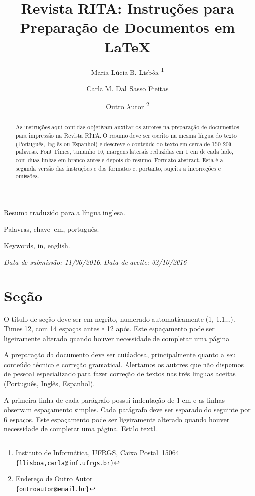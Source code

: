 \documentclass{RITA}
\title{Revista RITA: Instruções para Preparação de Documentos em \LaTeX}
\author{
Maria Lúcia B. Lisbôa
\footnote{Instituto de Informática, UFRGS, Caixa Postal~15064\\
  \texttt{\{llisboa,carla@inf.ufrgs.br\}}}
\and
Carla M. Dal~Sasso Freitas
\footnotemark[1]
\and
Outro Autor
\footnote{Endereço de Outro Autor\\
  \texttt{\{outroautor@email.br\}}}
}
\begin{document}
\maketitle

\begin{abstract}
As instruções aqui contidas objetivam auxiliar os autores na
preparação de documentos para impressão na Revista RITA.  O
resumo deve ser escrito na mesma língua do texto (Português, Inglês ou
Espanhol) e descreve o conteúdo do texto em cerca de 150-200
palavras. Font Times, tamanho 10, margens laterais reduzidas em 1 cm
de cada lado, com duas linhas em branco antes e depois do
resumo. Formato abstract. Esta é a segunda versão das instruções e
dos formatos e, portanto, sujeita a incorreções e omissões. 
\end{abstract}

\begin{abstractinenglish}
Resumo traduzido para a língua inglesa.
\end{abstractinenglish}

\begin{keywords}
Palavras, chave, em, português.
\end{keywords}

\begin{keywordsenglish}
Keywords, in, english.
\end{keywordsenglish}

\begin{center}                        
    \textit{Data de submissão: 11/06/2016}, \textit{Data de aceite: 02/10/2016}
\end{center}



\section{Seção}
O título de seção deve ser em negrito, numerado automaticamente (1, 1.1,..), Times 12, com 14 espaços antes e 12 após. Este espaçamento pode ser ligeiramente alterado quando houver necessidade de completar uma página.

A preparação do documento deve ser cuidadosa, principalmente quanto a seu conteúdo técnico e correção gramatical. Alertamos os autores que não dispomos de pessoal especializado para fazer correção de textos nas três línguas aceitas (Português, Inglês, Espanhol).

A primeira linha de cada parágrafo possui indentação de 1 cm e as linhas observam espaçamento simples. Cada parágrafo  deve ser separado do seguinte por  6  espaços. Este espaçamento pode ser ligeiramente alterado quando houver necessidade de completar uma página. Estilo text1.
\end{document}
